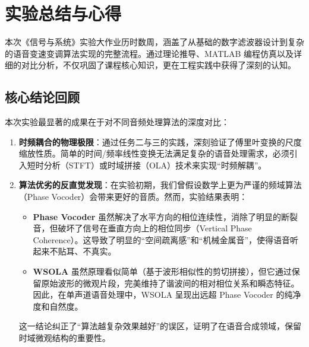 \documentclass[12pt]{ctexart}
\begin{document}
\newpage


\section{实验总结与心得}

本次《信号与系统》实验大作业历时数周，涵盖了从基础的数字滤波器设计到复杂的语音变速变调算法实现的完整流程。通过理论推导、MATLAB 编程仿真以及详细的对比分析，不仅巩固了课程核心知识，更在工程实践中获得了深刻的认知。

\subsection{核心结论回顾}
本次实验最显著的成果在于对不同音频处理算法的深度对比：
\begin{enumerate}
    \item \textbf{时频耦合的物理极限}：通过任务二与三的实践，深刻验证了傅里叶变换的尺度缩放性质。简单的时间/频率线性变换无法满足复杂的语音处理需求，必须引入短时分析（STFT）或时域拼接（OLA）技术来实现“时频解耦”。
    \item \textbf{算法优劣的反直觉发现}：在实验初期，我们曾假设数学上更为严谨的频域算法（Phase Vocoder）会带来更好的音质。然而，实验结果表明：
    \begin{itemize}
        \item \textbf{Phase Vocoder} 虽然解决了水平方向的相位连续性，消除了明显的断裂音，但破坏了信号在垂直方向上的相位同步（Vertical Phase Coherence）。这导致了明显的“空间疏离感”和“机械金属音”，使得语音听起来不贴耳、不真实。
        \item \textbf{WSOLA} 虽然原理看似简单（基于波形相似性的剪切拼接），但它通过保留原始波形的微观片段，完美维持了谐波间的相对相位关系和瞬态特征。因此，在单声道语音处理中，WSOLA 呈现出远超 Phase Vocoder 的纯净度和自然度。
    \end{itemize}
    这一结论纠正了“算法越复杂效果越好”的误区，证明了在语音合成领域，保留时域微观结构的重要性。
\end{enumerate}
\end{document}

